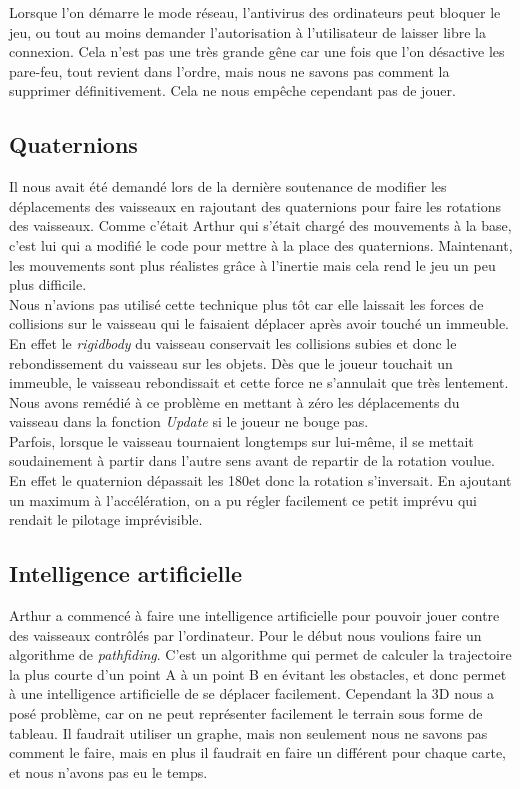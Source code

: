 \documentclass[10pt, titlepage]{report}
\begin{document}
Lorsque l'on démarre le mode réseau, l'antivirus des ordinateurs peut bloquer le jeu, ou tout au moins demander l'autorisation à l'utilisateur de laisser libre la connexion. Cela n'est pas une très grande gêne car une fois que l'on désactive les pare-feu, tout revient dans l'ordre, mais nous ne savons pas comment la supprimer définitivement. Cela ne nous empêche cependant pas de jouer.\\

\subsection{Quaternions}
Il nous avait été demandé lors de la dernière soutenance de modifier les déplacements des vaisseaux en rajoutant des quaternions pour faire les rotations des vaisseaux. Comme c'était Arthur qui s'était chargé des mouvements à la base, c'est lui qui a modifié le code pour mettre à la place des quaternions. Maintenant, les mouvements sont plus réalistes grâce à l'inertie mais cela rend le jeu un peu plus difficile.\\

Nous n'avions pas utilisé cette technique plus tôt car elle laissait les forces de collisions sur le vaisseau qui le faisaient déplacer après avoir touché un immeuble. En effet le \textit{rigidbody} du vaisseau conservait les collisions subies et donc le rebondissement du vaisseau sur les objets. Dès que le joueur touchait un immeuble, le vaisseau rebondissait et cette force ne s'annulait que très lentement. Nous avons remédié à ce problème en mettant à zéro les déplacements du vaisseau dans la fonction \textit{Update} si le joueur ne bouge pas.\\

Parfois, lorsque le vaisseau tournaient longtemps sur lui-même, il se mettait soudainement à partir dans l'autre sens avant de repartir de la rotation voulue. En effet le quaternion dépassait les 180\textdegree  et donc la rotation s'inversait. En ajoutant un maximum à l'accélération, on a pu régler facilement ce petit imprévu qui rendait le pilotage imprévisible.\\

\subsection{Intelligence artificielle}

Arthur a commencé à faire une intelligence artificielle pour pouvoir jouer contre des vaisseaux contrôlés par l'ordinateur. Pour le début nous voulions faire un algorithme de \textit{pathfiding}. C'est un algorithme qui permet de calculer la trajectoire la plus courte d'un point A à un point B en évitant les obstacles, et donc permet à une intelligence artificielle de se déplacer facilement. Cependant la 3D nous a posé problème, car on ne peut représenter facilement le terrain sous forme de tableau. Il faudrait utiliser un graphe, mais non seulement nous ne savons pas comment le faire, mais en plus il faudrait en faire un différent pour chaque carte, et nous n'avons pas eu le temps.\\
\end{document}
